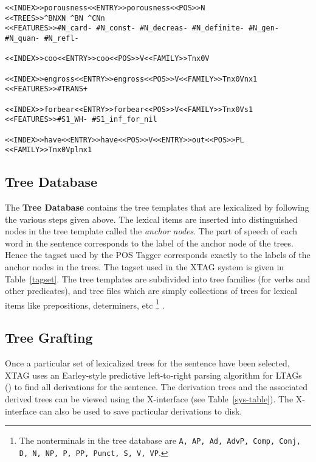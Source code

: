 \begin{table}[htb] 
\begin{verbatim} 
<<INDEX>>porousness<<ENTRY>>porousness<<POS>>N 
<<TREES>>^BNXN ^BN ^CNn 
<<FEATURES>>#N_card- #N_const- #N_decreas- #N_definite- #N_gen- 
#N_quan- #N_refl- 
 
<<INDEX>>coo<<ENTRY>>coo<<POS>>V<<FAMILY>>Tnx0V 
 
<<INDEX>>engross<<ENTRY>>engross<<POS>>V<<FAMILY>>Tnx0Vnx1 
<<FEATURES>>#TRANS+ 
 
<<INDEX>>forbear<<ENTRY>>forbear<<POS>>V<<FAMILY>>Tnx0Vs1 
<<FEATURES>>#S1_WH- #S1_inf_for_nil 
 
<<INDEX>>have<<ENTRY>>have<<POS>>V<<ENTRY>>out<<POS>>PL 
<<FAMILY>>Tnx0Vplnx1 
\end{verbatim}   
\begin{rawhtml} <dl> <dt>{Example Syntactic Database Entries. <p> </dl> \end{rawhtml}
 
\label{syn-entries} 
\end{table} 
 
\subsection{Tree Database} 
\label{tree-db} 
 
The {\bf Tree Database} contains the tree templates that are 
lexicalized by following the various steps given above. The lexical 
items are inserted into distinguished nodes in the tree template 
called the {\em anchor nodes}.  The part of speech of each word in the 
sentence corresponds to the label of the anchor node of the trees. 
Hence the tagset used by the POS Tagger corresponds exactly to the 
labels of the anchor nodes in the trees.  The tagset used in the XTAG 
system is given in Table~\ref{tagset}. The tree templates are 
subdivided into tree families (for verbs and other predicates), and 
tree files which are simply collections of trees for lexical items 
like prepositions, determiners, etc%
\footnote{ The nonterminals in the tree database are {\tt A, AP, Ad,     AdvP, Comp, Conj, D, N, NP, P, PP, Punct, S, V, VP}.}%
. 
 
\subsection{Tree Grafting} 
 
Once a particular set of lexicalized trees for the sentence have been 
selected, XTAG uses an Earley-style predictive left-to-right parsing 
algorithm for LTAGs (\cite{schabesjoshi88,schabes90}) to find all 
derivations for the sentence. The derivation trees and the associated 
derived trees can be viewed using the X-interface (see 
Table~\ref{sys-table}). The X-interface can also be used to save 
particular derivations to disk. 
 
